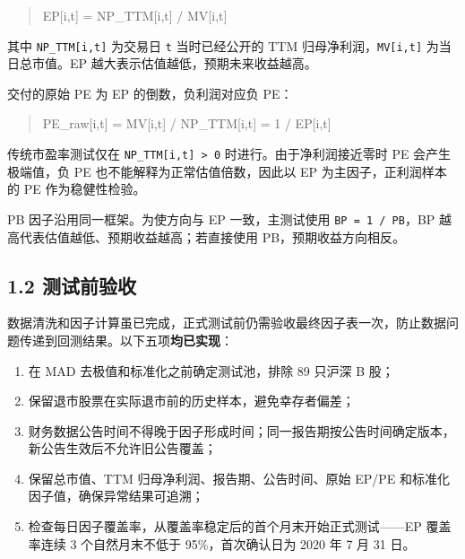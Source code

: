 \documentclass[UTF8,a4paper,11pt]{ctexart}
\begin{document}
\begin{quote}\ttfamily\small
EP[i,t] = NP\_TTM[i,t] / MV[i,t]\\
\end{quote}

其中 \texttt{NP\_TTM[i,t]} 为交易日 \texttt{t} 当时已经公开的 TTM 归母净利润，\texttt{MV[i,t]} 为当日总市值。EP 越大表示估值越低，预期未来收益越高。

交付的原始 PE 为 EP 的倒数，负利润对应负 PE：

\begin{quote}\ttfamily\small
PE\_raw[i,t] = MV[i,t] / NP\_TTM[i,t] = 1 / EP[i,t]\\
\end{quote}

传统市盈率测试仅在 \texttt{NP\_TTM[i,t] > 0} 时进行。由于净利润接近零时 PE 会产生极端值，负 PE 也不能解释为正常估值倍数，因此以 EP 为主因子，正利润样本的 PE 作为稳健性检验。

PB 因子沿用同一框架。为使方向与 EP 一致，主测试使用 \texttt{BP = 1 / PB}，BP 越高代表估值越低、预期收益越高；若直接使用 PB，预期收益方向相反。

{}
\subsection*{1.2 测试前验收}

数据清洗和因子计算虽已完成，正式测试前仍需验收最终因子表一次，防止数据问题传递到回测结果。以下五项\textbf{均已实现}：

\begin{enumerate}[leftmargin=2.2em,itemsep=2pt,topsep=3pt]
\item 
在 MAD 去极值和标准化之前确定测试池，排除 89 只沪深 B 股；

\item 
保留退市股票在实际退市前的历史样本，避免幸存者偏差；

\item 
财务数据公告时间不得晚于因子形成时间；同一报告期按公告时间确定版本，新公告生效后不允许旧公告覆盖；

\item 
保留总市值、TTM 归母净利润、报告期、公告时间、原始 EP/PE 和标准化因子值，确保异常结果可追溯；

\item 
检查每日因子覆盖率，从覆盖率稳定后的首个月末开始正式测试——EP 覆盖率连续 3 个自然月末不低于 95\%，首次确认日为 2020 年 7 月 31 日。

\end{enumerate}
\end{document}
